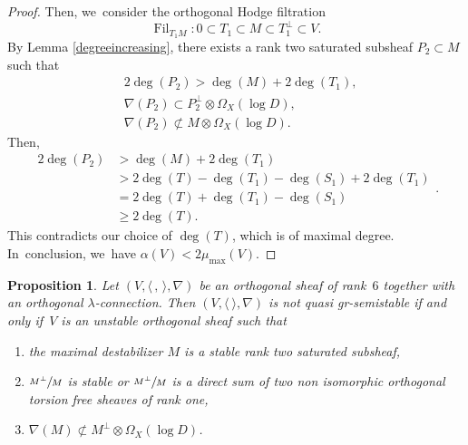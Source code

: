 \documentclass[11pt]{article}
\numberwithin{equation}{section}
\newcommand{\lconnection}{$\lambda$\nobreakdash-con\-nec\-tion\xspace}
\newcommand{\grsemistable}{gr\nobreakdash-semi\-stable\xspace}
\DeclareMathOperator{\Filt}{Fil}
\theoremstyle{plain}
\newtheorem{prop}[thm]{Proposition}
\theoremstyle{definition}
\begin{document}
\begin{proof}
Then, we~consider the orthogonal Hodge filtration
\[
\Filt_{T_1M}:0\subset T_1\subset M\subset T_1^\perp \subset V.
\]
By Lemma \ref{degreeincreasing}, there exists a rank two saturated subsheaf $P_2 \subset M$ such that
\begin{align*}
& 2\deg(P_2)>\deg(M)+2\deg(T_1), \\
& \nabla(P_2)\subset P_2^\perp\otimes\Omega_X(\log D), \\
& \nabla(P_2)\not\subset M\otimes\Omega_X(\log D).
\end{align*}
Then,
\begin{equation*}
\begin{split}
2\deg(P_2)&>\deg(M)+2\deg(T_1)\\
&>2\deg(T)-\deg(T_1)-\deg(S_1)+2\deg(T_1)\\
&=2\deg(T)+\deg(T_1)-\deg(S_1)\\
&\geq 2\deg(T).
\end{split}.
\end{equation*}
This contradicts our choice of $\deg(T)$, which is of maximal degree. In~conclusion, we~have $\alpha(V)<2\mu_{\max}(V)$.
\end{proof}


\begin{prop}\label{classfication6}
Let $(V,\langle \,, \, \rangle,\nabla)$ be an orthogonal sheaf of rank~$6$ together with an orthogonal \lconnection. Then $(V,\langle \ \rangle,\nabla)$ is not quasi \grsemistable if and only if~$V$ is an unstable orthogonal sheaf such that
\begin{enumerate}
\item the maximal destabilizer $M$ is a stable rank two saturated subsheaf,
\item $\sfrac{M^\perp}{M}$ is stable or $\sfrac{M^\perp}{M}$ is a direct sum of two non isomorphic orthogonal torsion free sheaves of rank one,
\item $\nabla(M)\not\subset M^\perp\otimes\Omega_X(\log D)$.
\end{enumerate}
\end{prop}
\end{document}

